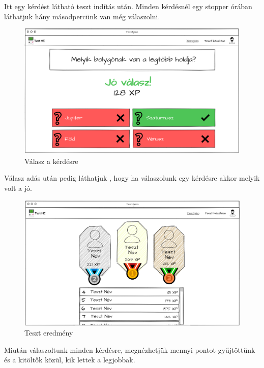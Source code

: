 Itt  egy kérdést látható teszt indítás után. Minden kérdésnél egy stopper órában láthatjuk hány másodpercünk van még válaszolni.

\begin{figure}[H]
    \centering
    \includegraphics[width=\linewidth]{images/test2_wireframe.png}
    \caption{Válasz a kérdésre}
    \label{fig:test_answer}
\end{figure}

Válasz adás után pedig láthatjuk , hogy ha válaszolunk egy kérdésre akkor melyik volt a jó.

\begin{figure}[H]
    \centering
    \includegraphics[width=\linewidth]{images/test3_wireframe.png}
    \caption{Teszt eredmény}
    \label{fig:test_finished}
\end{figure}

Miután válaszoltunk minden kérdésre, megnézhetjük mennyi pontot gyűjtöttünk és a kitöltők közül, kik lettek a legjobbak. 


